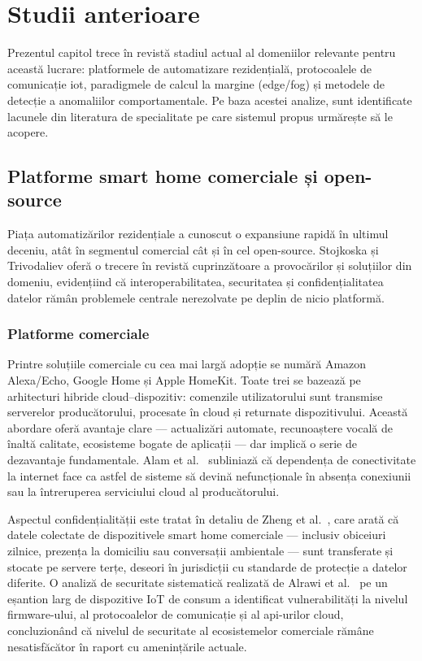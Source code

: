 \chapter{Studii anterioare}
\label{ch:studii}

Prezentul capitol trece în revistă stadiul actual al domeniilor relevante pentru această
lucrare: platformele de automatizare rezidențială, protocoalele de comunicație \gls{iot},
paradigmele de calcul la margine (edge/fog) și metodele de detecție a anomaliilor comportamentale.
Pe baza acestei analize, sunt identificate lacunele din literatura de specialitate pe care
sistemul propus urmărește să le acopere.

\section{Platforme smart home comerciale și open-source}
\label{sec:studii-platforme}

Piața automatizărilor rezidențiale a cunoscut o expansiune rapidă în ultimul deceniu, atât
în segmentul comercial cât și în cel open-source. Stojkoska și Trivodaliev \cite{stojkoska2017smarthome}
oferă o trecere în revistă cuprinzătoare a provocărilor și soluțiilor din domeniu, evidențiind
că interoperabilitatea, securitatea și confidențialitatea datelor rămân problemele centrale
nerezolvate pe deplin de nicio platformă.

\subsection{Platforme comerciale}

Printre soluțiile comerciale cu cea mai largă adopție se numără Amazon Alexa/Echo,
Google Home și Apple HomeKit. Toate trei se bazează pe arhitecturi hibride cloud–dispozitiv:
comenzile utilizatorului sunt transmise serverelor producătorului, procesate în cloud și
returnate dispozitivului. Această abordare oferă avantaje clare — actualizări automate,
recunoaștere vocală de înaltă calitate, ecosisteme bogate de aplicații — dar implică o
serie de dezavantaje fundamentale. Alam et al.\ \cite{alam2012smarthome} subliniază că
dependența de conectivitate la internet face ca astfel de sisteme să devină nefuncționale
în absența conexiunii sau la întreruperea serviciului cloud al producătorului.

Aspectul confidențialității este tratat în detaliu de Zheng et al.\ \cite{zheng2018smarthomeprivacy},
care arată că datele colectate de dispozitivele smart home comerciale — inclusiv obiceiuri
zilnice, prezența la domiciliu sau conversații ambientale — sunt transferate și stocate pe
servere terțe, deseori în jurisdicții cu standarde de protecție a datelor diferite. O
analiză de securitate sistematică realizată de Alrawi et al.\ \cite{alrawi2019sokhome} pe
un eșantion larg de dispozitive IoT de consum a identificat vulnerabilități la nivelul
firmware-ului, al protocoalelor de comunicație și al \gls{api}-urilor cloud, concluzionând
că nivelul de securitate al ecosistemelor comerciale rămâne nesatisfăcător în raport cu
amenințările actuale.

